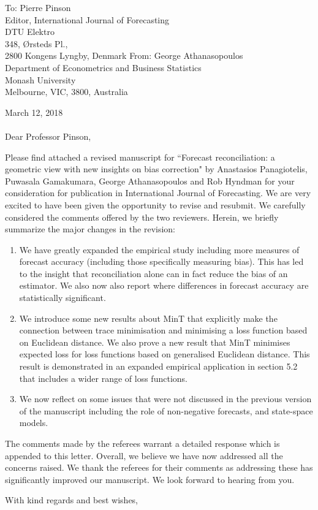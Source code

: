 \documentclass[11pt,a4paper]{letter}
\date{}
\begin{document}
 \begin{letter}{To: Pierre Pinson\\
 	Editor, International Journal of Forecasting\\
 	DTU Elektro\\
 	348, {\O}rsteds Pl., \\
 	2800 Kongens Lyngby, Denmark}
    From: George Athanasopoulos\\
    Department of Econometrics and Business Statistics\\
    Monash University\\
    Melbourne, VIC, 3800, Australia
 
 \opening{ March 12, 2018\\ \\Dear Professor Pinson,}
 \medskip

Please find attached a revised manuscript for ``Forecast reconciliation: a geometric view with new insights on bias correction" by Anastasios Panagiotelis, Puwasala Gamakumara, George Athanasopoulos and Rob Hyndman for your consideration for publication in International Journal of Forecasting. We are very excited to have been given the opportunity to revise and resubmit. We carefully considered the comments offered by the two reviewers. Herein, we briefly summarize the major changes in the revision:
\begin{enumerate}
	\item We have greatly expanded the empirical study including more measures of forecast accuracy (including those specifically measuring bias).  This has led to the insight that reconciliation alone can in fact reduce the bias of an estimator.  We also now also report where differences in forecast accuracy are statistically significant.
	\item We introduce some new results about MinT that explicitly make the connection between trace minimisation and minimising a loss function based on Euclidean distance.  We also prove a new result that MinT minimises expected loss for loss functions based on generalised Euclidean distance.  This result is demonstrated in an expanded empirical application in section 5.2 that includes a wider range of loss functions. 
	\item We now reflect on some issues that were not discussed in the previous version of the manuscript including the role of non-negative forecasts, and state-space models. 
\end{enumerate}

The comments made by the referees warrant a detailed response which is appended to this letter. Overall, we believe we have now addressed all the concerns raised. We thank the referees for their comments as addressing these has significantly improved our manuscript. We look forward to hearing from you.

 \closing{With kind regards and best wishes,}

 \end{letter}
\end{document}
